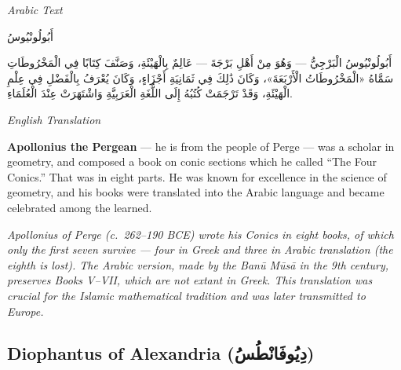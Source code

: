 \documentclass[11pt,a4paper]{article}
\def\RL#1{\beginR#1\endR}
\newcommand{\cnote}[1]{\textcolor{notecolor}{\textit{#1}}}
\newcommand{\textarabic}[1]{{\arabicfont\RL{#1}}}
\newenvironment{arabiccol}{%
  \begin{minipage}[t]{0.48\textwidth}%
  \begin{tcolorbox}[colback=leftbg,colframe=rulecolor,boxrule=0.4pt,arc=2pt,left=5pt,right=5pt,top=5pt,bottom=5pt]%
  \centering\textit{\footnotesize Arabic Text}\\[0.4em]%
  \raggedright\arabicfont\small%
}{%
  \end{tcolorbox}%
  \end{minipage}%
}
\newenvironment{englishcol}{%
  \begin{minipage}[t]{0.48\textwidth}%
  \begin{tcolorbox}[colback=rightbg,colframe=rulecolor,boxrule=0.4pt,arc=2pt,left=5pt,right=5pt,top=5pt,bottom=5pt]%
  \centering\textit{\footnotesize English Translation}\\[0.4em]%
  \raggedright\small%
}{%
  \end{tcolorbox}%
  \end{minipage}%
}
\begin{document}
\noindent
\begin{arabiccol}
\beginR
أَبُولُونْيُوسُ

أَبُولُونْيُوسُ الْبَرْجِيُّ — وَهُوَ مِنْ أَهْلِ بَرْجَةَ — عَالِمٌ بِالْهَيْئَةِ، وَصَنَّفَ كِتَابًا فِي الْمَخْرُوطَاتِ سَمَّاهُ «الْمَخْرُوطَاتُ الْأَرْبَعَةَ»، وَكَانَ ذَٰلِكَ فِي ثَمَانِيَةِ أَجْزَاءٍ، وَكَانَ يُعْرَفُ بِالْفَضْلِ فِي عِلْمِ الْهَيْئَةِ، وَقَدْ تَرْجَمَتْ كُتُبُهُ إِلَى اللُّغَةِ الْعَرَبِيَّةِ وَاشْتَهَرَتْ عِنْدَ الْعُلَمَاءِ.
\endR
\end{arabiccol}
\hfill
\begin{englishcol}
\textbf{Apollonius the Pergean} --- he is from the people of Perge --- was a scholar in geometry, and composed a book on conic sections which he called ``The Four Conics.'' That was in eight parts. He was known for excellence in the science of geometry, and his books were translated into the Arabic language and became celebrated among the learned.

\cnote{Apollonius of Perge (c.~262--190 BCE) wrote his \textit{Conics} in eight books, of which only the first seven survive --- four in Greek and three in Arabic translation (the eighth is lost). The Arabic version, made by the Banū Mūsā in the 9th century, preserves Books V--VII, which are not extant in Greek. This translation was crucial for the Islamic mathematical tradition and was later transmitted to Europe.}
\end{englishcol}

\par\vspace{0.5em}

\subsection{Diophantus of Alexandria (\textarabic{دِيُوفَانْطُسُ})}
\end{document}
